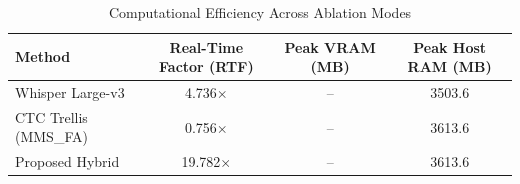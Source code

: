 \begin{table}[t]
\centering
\caption{Computational Efficiency Across Ablation Modes}
\label{tab:computational_performance}
\begin{tabular}{lccc}
\toprule
Method & Real-Time Factor (RTF) & Peak VRAM (MB) & Peak Host RAM (MB) \\
\midrule
Whisper Large-v3 & 4.736\(\times\) & -- & 3503.6 \\
CTC Trellis (MMS\_FA) & 0.756\(\times\) & -- & 3613.6 \\
Proposed Hybrid & 19.782\(\times\) & -- & 3613.6 \\
\bottomrule
\end{tabular}
\end{table}
